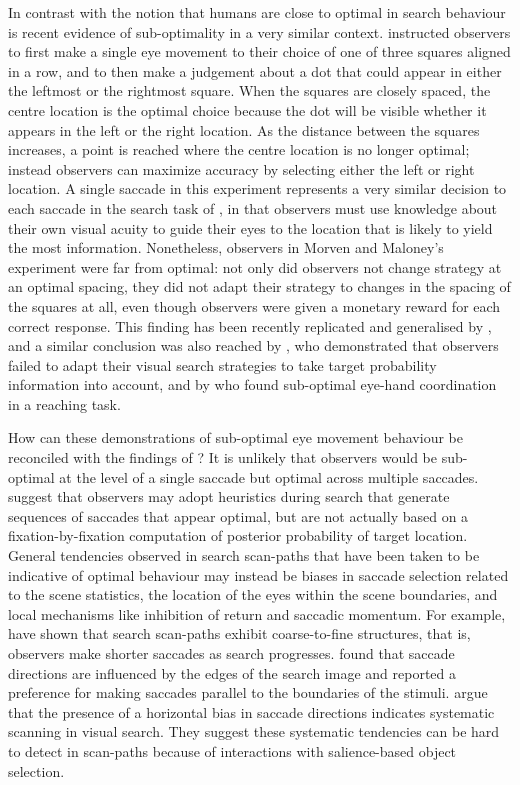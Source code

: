 \documentclass[man]{apa6}
\begin{document}
In contrast with the notion that humans are close to optimal in search behaviour is recent evidence of sub-optimality in a very similar context. \textcite{morvan2012} instructed observers to first make a single eye movement to their choice of one of three squares aligned in a row, and to then make a judgement about a dot that could appear in either the leftmost or the rightmost square. When the squares are closely spaced, the centre location is the optimal choice because the dot will be visible whether it appears in the left or the right location. As the distance between the squares increases, a point is reached where the centre location is no longer optimal; instead observers can maximize accuracy by selecting either the left or right location. A single saccade in this experiment represents a very similar decision to each saccade in the search task of  \textcite{najemnik-geisler2005}, in that observers must use knowledge about their own visual acuity to guide their eyes to the location that is likely to yield the most information. Nonetheless, observers in Morven and Maloney's experiment were far from optimal: not only did observers not change strategy at an optimal spacing, they did not adapt their strategy to changes in the spacing of the squares at all, even though observers were given a monetary reward for each correct response. This finding has been recently replicated and generalised by \textcite{clarke_hunt2015}, and a similar conclusion was also reached by \textcite{verghese2012}, who demonstrated that observers failed to adapt their visual search strategies to take target probability information into account, and by \textcite{zhang2012} who found sub-optimal eye-hand coordination in a reaching task.

How can these demonstrations of sub-optimal eye movement behaviour be reconciled with the findings of \textcite{najemnik-geisler2005,najemnik-geisler2008}? It is unlikely that observers would be sub-optimal at the level of a single saccade but optimal across multiple saccades. \textcite{morvan2012} suggest that observers may adopt heuristics during search that generate sequences of saccades that appear optimal, but are not actually based on a fixation-by-fixation computation of posterior probability of target location. General tendencies observed in search scan-paths that have been taken to be indicative of optimal behaviour may instead be biases in saccade selection related to the scene statistics, the location of the eyes within the scene boundaries, and local mechanisms like inhibition of return and saccadic momentum. For example, \textcite{over2007} have shown that search scan-paths exhibit coarse-to-fine structures, that is, observers make shorter saccades as search progresses. \textcite{over2003} found that saccade directions are influenced by the edges of the search image and reported a preference for making saccades parallel to the boundaries of the stimuli.  \textcite{gilchrist-harvey2006} argue that the presence of a horizontal bias in saccade directions indicates systematic scanning in visual search. They suggest these systematic tendencies can be hard to detect in scan-paths because of interactions with salience-based object selection. 
\end{document}
